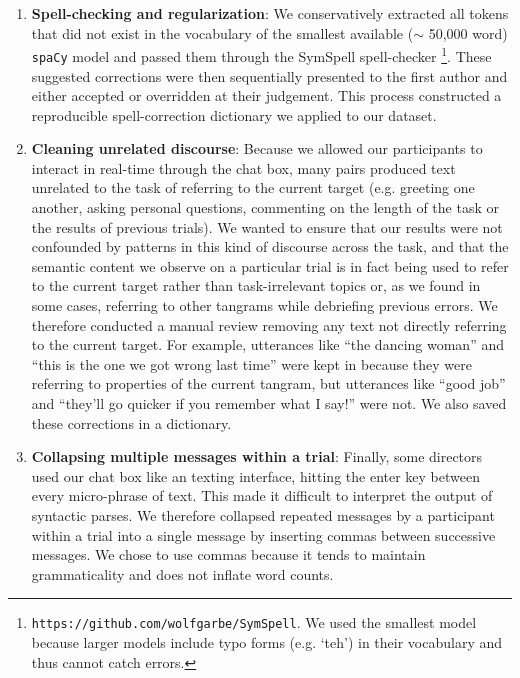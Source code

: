 \documentclass[alpha-refs]{wiley-article}
\begin{document}
\begin{enumerate}

\item \textbf{Spell-checking and regularization}: We conservatively extracted all tokens that did not exist in the vocabulary of the smallest available ($\sim$ 50,000 word) \texttt{spaCy} model and passed them through the SymSpell spell-checker \footnote{\texttt{https://github.com/wolfgarbe/SymSpell}. We used the smallest model because larger models include typo forms (e.g. `teh') in their vocabulary and thus cannot catch errors.}. These suggested corrections were then sequentially presented to the first author and either accepted or overridden at their judgement. This process constructed a reproducible spell-correction dictionary we applied to our dataset.

\item \textbf{Cleaning unrelated discourse}: Because we allowed our participants to interact in real-time through the chat box, many pairs produced text unrelated to the task of referring to the current target (e.g. greeting one another, asking personal questions, commenting on the length of the task or the results of previous trials). We wanted to ensure that our results were not confounded by patterns in this kind of discourse across the task, and that the semantic content we observe on a particular trial is in fact being used to refer to the current target rather than task-irrelevant topics or, as we found in some cases, referring to other tangrams while debriefing previous errors. We therefore conducted a manual review removing any text not directly referring to the current target. For example, utterances like ``the dancing woman'' and ``this is the one we got wrong last time'' were kept in because they were referring to properties of the current tangram, but utterances like ``good job'' and ``they'll go quicker if you remember what I say!'' were not. We also saved these corrections in a dictionary.

\item \textbf{Collapsing multiple messages within a trial}: Finally, some directors used our chat box like an texting interface, hitting the enter key between every micro-phrase of text. This made it difficult to interpret the output of syntactic parses. We therefore collapsed repeated messages by a participant within a trial into a single message by inserting commas between successive messages. We chose to use commas because it tends to maintain grammaticality and does not inflate word counts.

\end{enumerate}
\end{document}
